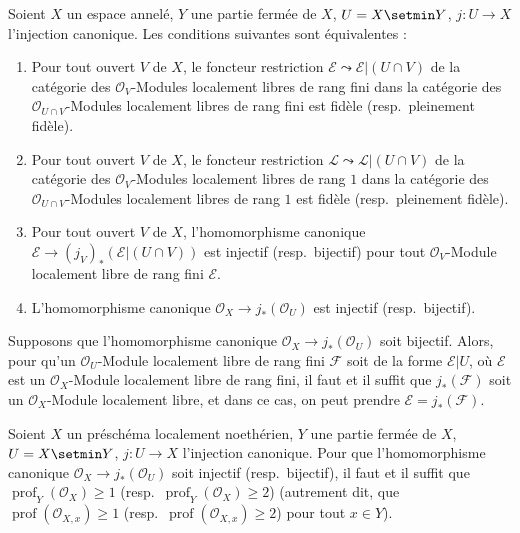 \begin{corollary}[21.13.3]
\label{IV.21.13.3}
Soient $X$ un espace annelé, $Y$ une partie fermée de $X$, $U=X\setmin Y$,
$j:U\to X$ l'injection canonique. Les conditions suivantes sont équivalentes :
\begin{enumerate}[label=\emph{\alph*)}]
  \item Pour tout ouvert $V$ de $X$, le foncteur restriction
  $\mathscr E\leadsto\mathscr E|(U\cap V)$ de la catégorie des
  $\mathcal O_V$-Modules localement libres de rang fini dans la catégorie des
  $\mathcal O_{U\cap V}$-Modules localement libres de rang fini est fidèle
  \textup{(resp.}\ pleinement fidèle\textup{)}.
  \item[\emph{a')}] Pour tout ouvert $V$ de $X$, le foncteur restriction
  $\mathscr L\leadsto\mathscr L|(U\cap V)$ de la catégorie des
  $\mathcal O_V$-Modules localement libres de rang $1$ dans la catégorie des
  $\mathcal O_{U\cap V}$-Modules localement libres de rang $1$ est fidèle
  \textup{(resp.}\ pleinement fidèle\textup{)}.
  \item Pour tout ouvert $V$ de $X$, l'homomorphisme canonique
  $\mathscr E\to(j_V)_*(\mathscr E|(U\cap V))$ est injectif \textup{(resp.}\ bijectif\textup{)} pour
  tout $\mathcal O_V$-Module localement libre de rang fini $\mathscr E$.
  \item[\emph{b')}] L'homomorphisme canonique
  $\mathcal O_X\to j_*(\mathcal O_U)$ est injectif \textup{(resp.}\ bijectif\textup{)}.
\end{enumerate}

Supposons que l'homomorphisme canonique $\mathcal O_X\to j_*(\mathcal O_U)$ soit
bijectif. Alors, pour qu'un $\mathcal O_U$-Module localement libre de rang fini
$\mathscr F$ soit de la forme $\mathscr E|U$, où $\mathscr E$ est un
$\mathcal O_X$-Module localement libre de rang fini, il faut et il suffit que
$j_*(\mathscr F)$ soit un $\mathcal O_X$-Module localement libre, et dans ce cas, on
peut prendre $\mathscr E=j_*(\mathscr F)$.
\end{corollary}

\begin{lemma}[21.13.4]
\label{IV.21.13.4}
Soient $X$ un préschéma localement noethérien, $Y$ une partie fermée de $X$,
$U=X\setmin Y$, $j:U\to X$ l'injection canonique. Pour que l'homomorphisme canonique
$\mathcal O_X\to j_*(\mathcal O_U)$ soit injectif \textup{(resp.}\ bijectif\textup{)}, il faut et il
suffit que $\operatorname{prof}_Y(\mathcal O_X)\geq1$
\textup{(resp.\ $\operatorname{prof}_Y(\mathcal O_X)\geq2$) (autrement dit, que
$\operatorname{prof}(\mathcal O_{X,x})\geq1$
(resp.\ $\operatorname{prof}(\mathcal O_{X,x})\geq2$) pour tout $x\in Y$)}.
\end{lemma}

